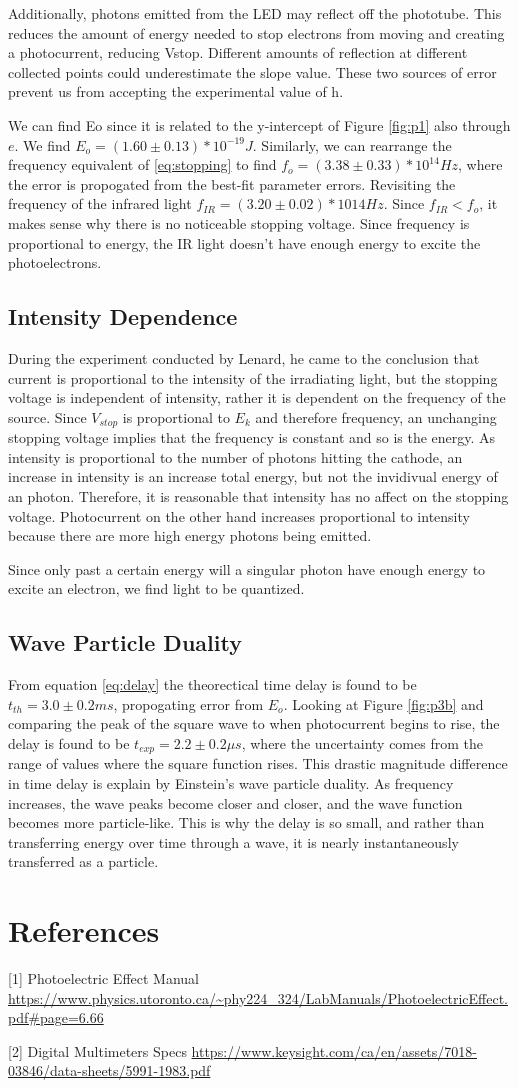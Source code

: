\documentclass[12pt,twocolumn]{article}
\begin{document}
Additionally, photons emitted from the LED may reflect off the phototube. This reduces the amount of energy needed to stop electrons from moving and creating a photocurrent, reducing Vstop. Different amounts of reflection at different collected points could underestimate the slope value. These two sources of error prevent us from accepting the experimental value of h.

We can find Eo since it is related to the y-intercept of Figure \ref{fig:p1} also through $e$. We find $E_o =(1.60 \pm 0.13)*10^{-19} J$. 
Similarly, we can rearrange the frequency equivalent of \ref{eq:stopping} to find $f_o=(3.38 \pm 0.33)*10^{14}Hz$, where the error is propogated from the best-fit parameter errors.
Revisiting the frequency of the infrared light $f_{IR} = (3.20\pm0.02) * 1014 Hz$. Since $f_{IR} < f_o$, it makes sense why there is no noticeable stopping voltage. Since frequency is proportional to energy, the IR light doesn't have enough energy to excite the photoelectrons. 

\subsection{Intensity Dependence}
During the experiment conducted by Lenard, he came to the conclusion that current is proportional to the intensity of the irradiating light, but the stopping voltage is independent of intensity, rather it is dependent on the frequency of the source. 
Since $V_{stop}$ is proportional to $E_k$ and therefore frequency, an unchanging stopping voltage implies that the frequency is constant and so is the energy. 
As intensity is proportional to the number of photons hitting the cathode, an increase in intensity is an increase total energy, but not the invidivual energy of an photon. 
Therefore, it is reasonable that intensity has no affect on the stopping voltage. Photocurrent on the other hand increases proportional to intensity because there are more high energy photons being emitted.

Since only past a certain energy will a singular photon have enough energy to excite an electron, we find light to be quantized.

\subsection{Wave Particle Duality}
From equation \ref{eq:delay} the theorectical time delay is found to be $t_{th} = 3.0 \pm 0.2 ms$, propogating error from $E_o$. Looking at Figure \ref{fig:p3b} and comparing the peak of the square wave to when photocurrent begins to rise, the delay is found to be $t_{exp} = 2.2 \pm 0.2\mu s$, where the uncertainty comes from the range of values where the square function rises.
This drastic magnitude difference in time delay is explain by Einstein's wave particle duality. As frequency increases, the wave peaks become closer and closer, and the wave function becomes more particle-like. 
This is why the delay is so small, and rather than transferring energy over time through a wave, it is nearly instantaneously transferred as a particle.


\section{References}
[1] Photoelectric Effect Manual \url{https://www.physics.utoronto.ca/~phy224_324/LabManuals/PhotoelectricEffect.pdf#page=6.66}

[2] Digital Multimeters Specs \url{https://www.keysight.com/ca/en/assets/7018-03846/data-sheets/5991-1983.pdf}
\end{document}
